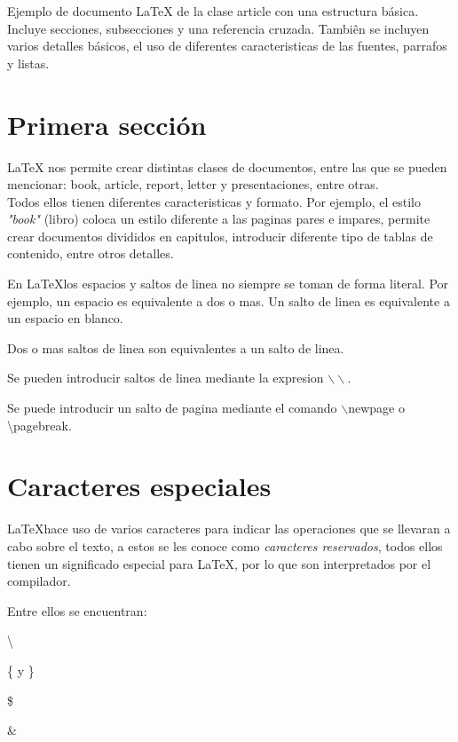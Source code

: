 \documentclass[letterpaper,12pt]{article}
\begin{document}
Ejemplo de documento \LaTeX{} de la clase {\ttfamily article} con una estructura b\'asica. 
Incluye secciones, subsecciones y una referencia cruzada. Tambi\^en se incluyen varios 
detalles b\'asicos, el uso de diferentes caracteristicas de las fuentes, parrafos y listas.

\section{Primera secci\'on}\label{primera}

\LaTeX{} nos permite crear distintas clases de documentos, entre las que se pueden mencionar: 
book, article, report, letter y presentaciones, entre otras.\\


Todos ellos tienen diferentes caracteristicas y formato. Por ejemplo, el estilo \textit{"book"} 
(libro) coloca un estilo diferente a las paginas pares e impares, permite crear documentos 
divididos en capitulos, introducir diferente  tipo de tablas de contenido, entre otros detalles.





En \LaTeX los espacios y saltos de linea no siempre se toman de forma literal.
Por ejemplo, un espacio        es      equivalente a      dos o mas. 
Un salto de linea es equivalente a un espacio en blanco.

Dos o mas saltos de linea son equivalentes a un salto de linea.

Se pueden introducir saltos de linea mediante la expresion $\backslash\backslash$.

Se puede introducir un salto de pagina mediante el comando $\backslash$newpage o \textbackslash pagebreak.

\section{Caracteres especiales}

\LaTeX hace uso de varios caracteres para indicar las operaciones que se llevaran a cabo sobre el texto, a estos se les conoce como \emph{caracteres reservados}, todos ellos tienen un significado especial para \LaTeX, por lo que son interpretados por el compilador.

Entre ellos se encuentran:

\textbackslash

\{ y \}

\$

\&
\end{document}
